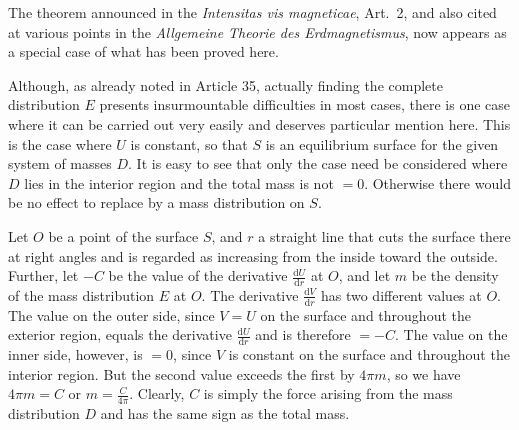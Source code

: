 The theorem announced in the \textit{Intensitas vis magneticae}, Art.\ 2, and also cited at various points in the \textit{Allgemeine Theorie des Erdmagnetismus}, now appears as a special case of what has been proved here.

Although, as already noted in Article 35, actually finding the complete distribution $E$ presents insurmountable difficulties in most cases, there is one case where it can be carried out very easily and deserves particular mention here. This is the case where $U$ is constant, so that $S$ is an equilibrium surface for the given system of masses $D$. It is easy to see that only the case need be considered where $D$ lies in the interior region and the total mass is not $=0$. Otherwise there would be no effect to replace by a mass distribution on $S$.

Let $O$ be a point of the surface $S$, and $r$ a straight line that cuts the surface there at right angles and is regarded as increasing from the inside toward the outside. Further, let $-C$ be the value of the derivative $\frac{\mathrm dU}{\mathrm dr}$ at $O$, and let $m$ be the density of the mass distribution $E$ at $O$. The derivative $\frac{\mathrm dV}{\mathrm dr}$ has two different values at $O$. The value on the outer side,
since $V=U$ on the surface and throughout the exterior region, equals the derivative $\frac{\mathrm dU}{\mathrm dr}$ and is therefore $=-C$. The value on the inner side, however, is $=0$, since $V$ is constant on the surface and throughout the interior region. But the second value exceeds the first by $4\pi m$, so we have $4\pi m=C$ or $m=\frac C{4\pi}$. Clearly, $C$ is simply the force arising from the mass distribution $D$ and has the same sign as the total mass.

